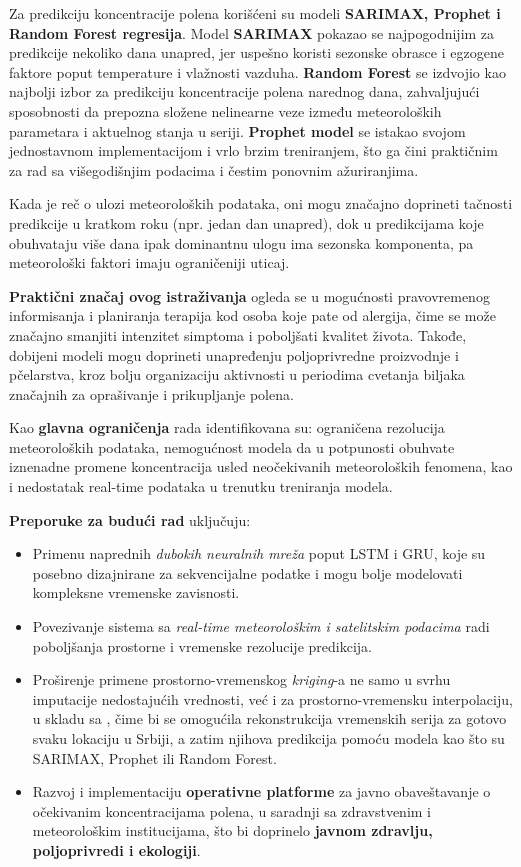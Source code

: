 \documentclass[12pt]{article}
\begin{document}
Za predikciju koncentracije polena korišćeni su modeli \textbf{SARIMAX, Prophet i Random Forest regresija}. Model \textbf{SARIMAX} pokazao se najpogodnijim za predikcije nekoliko dana unapred, jer uspešno koristi sezonske obrasce i egzogene faktore poput temperature i vlažnosti vazduha. \textbf{Random Forest} se izdvojio kao najbolji izbor za predikciju koncentracije polena narednog dana, zahvaljujući sposobnosti da prepozna složene nelinearne veze između meteoroloških parametara i aktuelnog stanja u seriji. \textbf{Prophet model} se istakao svojom jednostavnom implementacijom i vrlo brzim treniranjem, što ga čini praktičnim za rad sa višegodišnjim podacima i čestim ponovnim ažuriranjima.

Kada je reč o ulozi meteoroloških podataka, oni mogu značajno doprineti tačnosti predikcije u kratkom roku (npr. jedan dan unapred), dok u predikcijama koje obuhvataju više dana ipak dominantnu ulogu ima sezonska komponenta, pa meteorološki faktori imaju ograničeniji uticaj.

\textbf{Praktični značaj ovog istraživanja} ogleda se u mogućnosti pravovremenog informisanja i planiranja terapija kod osoba koje pate od alergija, čime se može značajno smanjiti intenzitet simptoma i poboljšati kvalitet života. Takođe, dobijeni modeli mogu doprineti unapređenju poljoprivredne proizvodnje i pčelarstva, kroz bolju organizaciju aktivnosti u periodima cvetanja biljaka značajnih za oprašivanje i prikupljanje polena.

Kao \textbf{glavna ograničenja} rada identifikovana su: ograničena rezolucija meteoroloških podataka, nemogućnost modela da u potpunosti obuhvate iznenadne promene koncentracija usled neočekivanih meteoroloških fenomena, kao i nedostatak real-time podataka u trenutku treniranja modela.

\textbf{Preporuke za budući rad} uključuju:
\begin{itemize}
    \item Primenu naprednih \textit{dubokih neuralnih mreža} poput LSTM i GRU, koje su posebno dizajnirane za sekvencijalne podatke i mogu bolje modelovati kompleksne vremenske zavisnosti.    
    \item Povezivanje sistema sa \textit{real-time meteorološkim i satelitskim podacima} radi poboljšanja prostorne i vremenske rezolucije predikcija.    
    \item Proširenje primene prostorno-vremenskog \textit{kriging}-a ne samo u svrhu imputacije nedostajućih vrednosti, već i za prostorno-vremensku interpolaciju, u skladu sa \cite{Sekulic2020}, čime bi se omogućila rekonstrukcija vremenskih serija za gotovo svaku lokaciju u Srbiji, a zatim njihova predikcija pomoću modela kao što su SARIMAX, Prophet ili Random Forest.
    \item Razvoj i implementaciju \textbf{operativne platforme} za javno obaveštavanje o očekivanim koncentracijama polena, u saradnji sa zdravstvenim i meteorološkim institucijama, što bi doprinelo \textbf{javnom zdravlju, poljoprivredi i ekologiji}.

\end{itemize}
\end{document}
